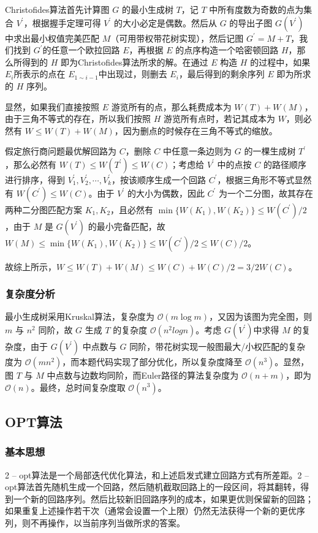 \documentclass[lang=cn,11pt,a4paper]{elegantpaper}
\begin{document}
Christofides算法首先计算图 $G$ 的最小生成树 $T$，记 $T$ 中所有度数为奇数的点为集合 $V^{'}$，根据握手定理可得 $V^{'}$ 的大小必定是偶数。然后从 $G$ 的导出子图 $G(V^{'})$ 中求出最小权值完美匹配 $M$（可用带权带花树实现），然后记图 $G^{'}=M+T$，我们找到 $G^{'}$的任意一个欧拉回路 $E$，再根据 $E$ 的点序构造一个哈密顿回路 $H$，那么所得到的 $H$ 即为Christofides算法所求的解。在通过 $E$ 构造 $H$ 的过程中，如果 $E_i$所表示的点在 $E_{1\sim i-1}$中出现过，则删去 $E_i$，最后得到的剩余序列 $E$ 即为所求的 $H$ 序列。

显然，如果我们直接按照 $E$ 游览所有的点，那么耗费成本为 $W(T) + W(M)$，由于三角不等式的存在，所以我们按照 $H$ 游览所有点时，若记其成本为 $W$，则必然有 $W \le W(T) + W(M)$，因为删点的时候存在三角不等式的缩放。

假定旅行商问题最优解回路为 $C$，删除 $C$ 中任意一条边则为 $G$ 的一棵生成树 $T^{'}$，那么必然有 $W(T) \le W(T^{'}) \le W(C)$；考虑给 $V^{'}$ 中的点按 $C$ 的路径顺序进行排序，得到 $V_1^\prime,V_2^\prime,\cdots,V_k^\prime$，按该顺序生成一个回路 $C^{'}$，根据三角形不等式显然有 $W(C^{'}) \le W(C)$。由于 $V^{'}$ 的大小为偶数，因此 $C^{'}$ 为一个二分图，故其存在两种二分图匹配方案 $K_1, K_2$，且必然有 $\min\{W(K_1), W(K_2)\} \le W(C^{'})/2$，由于 $M$ 是 $G(V^{'})$ 的最小完备匹配，故 $W(M) \le  \min\{W(K_1), W(K_2)\} \le W(C^{'})/2 \le W(C)/2$。

故综上所示，$W \le W(T) + W(M) \le W(C) + W(C)/2 = 3/2W(C)$。

\subsubsection{复杂度分析}
最小生成树采用Kruskal算法，复杂度为 $\mathcal{O}\left(m\log{m}\right)$，又因为该图为完全图，则 $m$ 与 $n^2$ 同阶，故 $G$ 生成 $T$ 的复杂度 $\mathcal{O}\left(n^2log{n}\right)$。考虑 $G(V^{'})$中求得 $M$ 的复杂度，由于 $G(V^{'})$ 中点数与 $G$ 同阶，带花树实现一般图最大/小权匹配的复杂度为 $\mathcal{O}\left(mn^2\right)$，而本题代码实现了部分优化，所以复杂度降至 $\mathcal{O}\left(n^3\right)$。显然，图 $T$ 与 $M$ 中点数与边数均同阶，而Euler路径的算法复杂度为 $\mathcal{O}\left(n+m\right)$，即为 $\mathcal{O}\left(n\right)$。最终，总时间复杂度取 $\mathcal{O}\left(n^3\right)$。


\subsection{OPT算法}
\subsubsection{基本思想}
2 – opt算法是一个局部迭代优化算法，和上述启发式建立回路方式有所差距。2 – opt算法首先随机生成一个回路，然后随机截取回路上的一段区间，将其翻转，得到一个新的回路序列。然后比较新旧回路序列的成本，如果更优则保留新的回路；如果重复上述操作若干次（通常会设置一个上限）仍然无法获得一个新的更优序列，则不再操作，以当前序列当做所求的答案。
\end{document}
